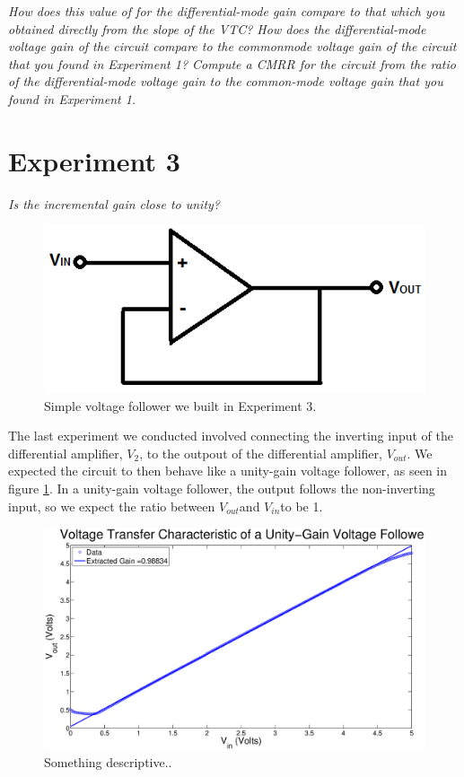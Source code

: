 \documentclass{article}
\newcommand{\Vtwo}{{$V_{2}$}}
\newcommand{\Vout}{{$V_{out}$}}
\newcommand{\Vin}{{$V_{in}$}}
\begin{document}
\textit{How does this value of for the differential-mode gain compare to that which you obtained directly from the slope of the
VTC? How does the differential-mode voltage gain of the circuit compare to the commonmode voltage gain of the circuit that you found in Experiment 1? Compute a CMRR for the circuit from the ratio of the differential-mode voltage gain to the common-mode voltage
gain that you found in Experiment 1.}


\section*{Experiment 3} 

\textit{Is the incremental gain close to unity?}

\begin{figure}[H]
\centering
\includegraphics[width=0.5\linewidth]{../Figures/Voltage-follower}
\caption{Simple voltage follower we built in Experiment 3.}
\label{fig:voltagefollow}
\end{figure}

The last experiment we conducted involved connecting the inverting input of the differential amplifier, \Vtwo, to the outpout of the differential amplifier, \Vout. We expected the circuit to then behave like a unity-gain voltage follower, as seen in figure \ref{fig:voltagefollow}. In a unity-gain voltage follower, the output follows the non-inverting input, so we expect the ratio between \Vout and \Vin to be 1.

\begin{figure}[H]
\centering
\includegraphics[width=\linewidth]{../Figures/Exp3P1.eps}
\caption{Something descriptive..}
\label{fig:exp3p1}
\end{figure}
\end{document}
